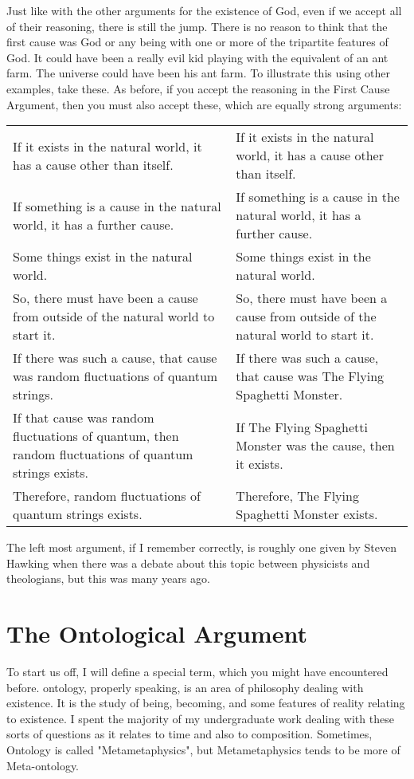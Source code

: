 Just like with the other arguments for the existence of God, even if we accept all of their reasoning, there is still the jump. There is no reason to think that the first cause was God or any being with one or more of the tripartite features of God. It could have been a really evil kid playing with the equivalent of an ant farm. The universe could have been his ant farm. To illustrate this using other examples, take these. As before, if you accept the reasoning in the First Cause Argument, then you must also accept these, which are equally strong arguments:
\begin{tabular}{p{2in}|p{2in}}
    If it exists in the natural world, it has a cause other than itself.&If it exists in the natural world, it has a cause other than itself.\\
    If something is a cause in the natural world, it has a further cause.&    If something is a cause in the natural world, it has a further cause.\\
    Some things exist in the natural world.&Some things exist in the natural world.\\
    So, there must have been a cause from outside of the natural world to start it.&So, there must have been a cause from outside of the natural world to start it.\\
    If there was such a cause, that cause was random fluctuations of quantum strings.&    If there was such a cause, that cause was The Flying Spaghetti Monster.\\
    If that cause was random fluctuations of quantum, then random fluctuations of quantum strings exists.& If The Flying Spaghetti Monster was the cause, then it exists.\\
    Therefore, random fluctuations of quantum strings exists.&Therefore, The Flying Spaghetti Monster exists.\\
\end{tabular}
The left most argument, if I remember correctly, is roughly one given by Steven Hawking when there was a debate about this topic between physicists and theologians, but this was many years ago.

\section{The Ontological Argument}
To start us off, I will define a special term, which you might have encountered before. \Gls{ontology}, properly speaking, is an area of philosophy dealing with existence. It is the study of being, becoming, and some features of reality relating to existence.  I spent the majority of my undergraduate work dealing with these sorts of questions as it relates to time and also to composition. Sometimes, Ontology is called "Metametaphysics", but Metametaphysics tends to be more of Meta-ontology.  

